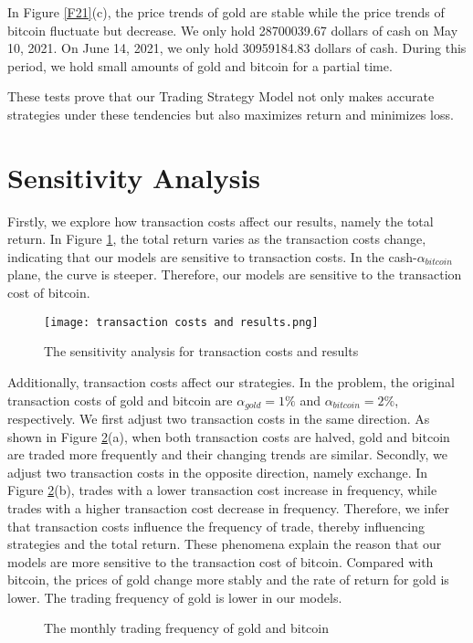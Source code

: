 \documentclass[12pt]{article}
\begin{document}
In Figure \ref{F21}(c), the price trends of gold are stable while the price trends of bitcoin fluctuate but decrease. We only hold 28700039.67 dollars of cash on May 10, 2021. On June 14, 2021, we only hold 30959184.83 dollars of cash. During this period, we hold small amounts of gold and bitcoin for a partial time.

These tests prove that our Trading Strategy Model not only makes accurate strategies under these tendencies but also maximizes return and minimizes loss. 

\section{Sensitivity Analysis}
Firstly, we explore how transaction costs affect our results, namely the total return. In Figure \ref{F15}, the total return varies as the transaction costs change, indicating that our models are sensitive to transaction costs. In the cash-$\alpha_{bitcoin}$ plane, the curve is steeper. Therefore, our models are sensitive to the transaction cost of bitcoin.
\begin{figure}[hbt]
 \centering
 \texttt{[image: transaction costs and results.png]}
 \caption{The sensitivity analysis for transaction costs and results}
 \label{F15} %
\end{figure}

Additionally, transaction costs affect our strategies. In the problem, the original transaction costs of gold and bitcoin are $\alpha_{gold}=1\%$ and $\alpha_{bitcoin}=2\%$, respectively. We first adjust two transaction costs in the same direction. As shown in Figure \ref{F16}(a), when both transaction costs are halved, gold and bitcoin are traded more frequently and their changing trends are similar. Secondly, we adjust two transaction costs in the opposite direction, namely exchange. In Figure \ref{F16}(b), trades with a lower transaction cost increase in frequency, while trades with a higher transaction cost decrease in frequency. Therefore, we infer that transaction costs influence the frequency of trade, thereby influencing strategies and the total return. These phenomena explain the reason that our models are more sensitive to the transaction cost of bitcoin. Compared with bitcoin, the prices of gold change more stably and the rate of return for gold is lower. The trading frequency of gold is lower in our models.
\begin{figure}[hbt]
 \centering
 \quad
 \caption{The monthly trading frequency of gold and bitcoin}
 \label{F16} %
\end{figure}
\end{document}
